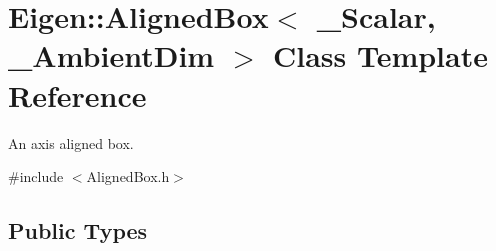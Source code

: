 \hypertarget{class_eigen_1_1_aligned_box}{}\section{Eigen\+::Aligned\+Box$<$ \+\_\+\+Scalar, \+\_\+\+Ambient\+Dim $>$ Class Template Reference}
\label{class_eigen_1_1_aligned_box}


An axis aligned box.  




{\ttfamily \#include $<$Aligned\+Box.\+h$>$}

\subsection*{Public Types}
